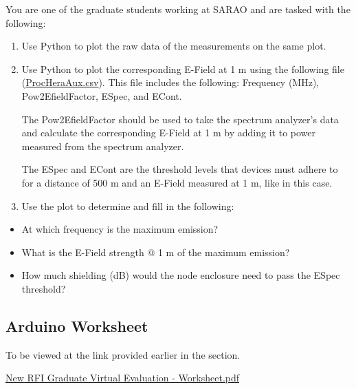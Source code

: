 \documentclass[12pt,a4paper]{report}
\begin{document}
	You are one of the graduate students working at SARAO and are tasked with the following:
	
	\begin{enumerate}
		\item Use Python to plot the raw data of the measurements on the same plot.
		\item Use Python to plot the corresponding E-Field at 1 m using the following file (\href{https://github.com/Casablanca25273/Worksheet}{ProcHeraAux.csv}). This file includes the following: Frequency (MHz), Pow2EfieldFactor, E\textunderscore Spec, and E\textunderscore Cont. 
		
		The Pow2EfieldFactor should be used to take the spectrum analyzer's data and calculate the corresponding E-Field at 1 m by adding it to power measured from the spectrum analyzer.
		
		The E\textunderscore Spec and E\textunderscore Cont are the threshold levels that devices must adhere to for a distance of 500 m and an E-Field measured at 1 m, like in this case.
		
		\item Use the plot to determine and fill in the following:
	\end{enumerate}
	
	\begin{itemize}
		\item At which frequency is the maximum emission?
		\item What is the E-Field strength @ 1 m of the maximum emission?
		\item How much shielding (dB) would the node enclosure need to pass the E\textunderscore Spec threshold?
	\end{itemize}
	
	\subsection*{Arduino Worksheet}
	
	To be viewed at the link provided earlier in the section.
	
	\href{https://github.com/Casablanca25273/Worksheet}{New RFI Graduate Virtual Evaluation - Worksheet.pdf}
	
	
	
	
	
	
	
	
	
	
	
	
	
	
	
\end{document}
